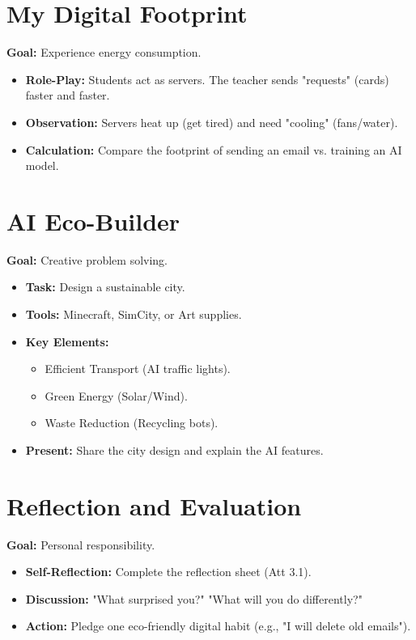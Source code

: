 \documentclass[11pt, a4paper]{article}
\begin{document}
\section{My Digital Footprint}
\textbf{Goal:} Experience energy consumption.
\begin{itemize}
    \item \textbf{Role-Play:} Students act as servers. The teacher sends "requests" (cards) faster and faster.
    \item \textbf{Observation:} Servers heat up (get tired) and need "cooling" (fans/water).
    \item \textbf{Calculation:} Compare the footprint of sending an email vs. training an AI model.
\end{itemize}

\section{AI Eco-Builder}
\textbf{Goal:} Creative problem solving.
\begin{itemize}
    \item \textbf{Task:} Design a sustainable city.
    \item \textbf{Tools:} Minecraft, SimCity, or Art supplies.
    \item \textbf{Key Elements:}
    \begin{itemize}
        \item Efficient Transport (AI traffic lights).
        \item Green Energy (Solar/Wind).
        \item Waste Reduction (Recycling bots).
    \end{itemize}
    \item \textbf{Present:} Share the city design and explain the AI features.
\end{itemize}

\section{Reflection and Evaluation}
\textbf{Goal:} Personal responsibility.
\begin{itemize}
    \item \textbf{Self-Reflection:} Complete the reflection sheet (Att 3.1).
    \item \textbf{Discussion:} "What surprised you?" "What will you do differently?"
    \item \textbf{Action:} Pledge one eco-friendly digital habit (e.g., "I will delete old emails").
\end{itemize}
\end{document}
